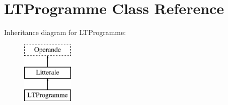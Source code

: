 \hypertarget{class_l_t_programme}{}\section{L\+T\+Programme Class Reference}
\label{class_l_t_programme}
Inheritance diagram for L\+T\+Programme\+:\begin{figure}[H]
\begin{center}
\leavevmode
\includegraphics[height=3.000000cm]{class_l_t_programme}
\end{center}
\end{figure}
